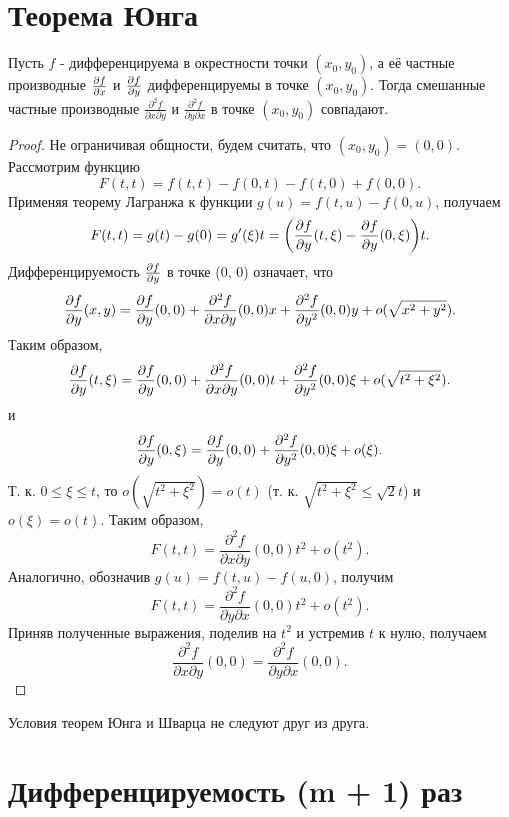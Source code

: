     \section{Теорема Юнга}
    
    \begin{theorem}[Юнг]
    	Пусть $f$ - дифференцируема в окрестности точки $(x_0, y_0)$, а её частные производные $\pdv{f}{x}$ и $\pdv{f}{y}$ дифференцируемы в точке $(x_0, y_0)$. Тогда смешанные частные производные $\frac{\partial^2 f}{\partial x \partial y}$ и $\frac{\partial^2 f}{\partial y \partial x}$ в точке $(x_0, y_0)$ совпадают.
    \end{theorem}
    
    \begin{proof}
    	Не ограничивая общности, будем считать, что $(x_0, y_0) = (0, 0)$. Рассмотрим функцию
    	\[ F(t, t) = f(t, t) - f(0, t) - f(t, 0) + f(0, 0). \]
    	Применяя теорему Лагранжа к функции $g(u) = f(t, u) - f(0, u)$, получаем
    	\[ F(t, t) = g(t) - g(0) = g'(\xi)t = \bigg(\frac{\partial f}{\partial y}(t, \xi) - \frac{\partial f}{\partial y}(0, \xi)\bigg)t. \]
    	Дифференцируемость $\frac{\partial f}{\partial y}$ в точке (0, 0) означает, что
    	\[ \frac{\partial f}{\partial y}(x, y) = \frac{\partial f}{\partial y}(0, 0) + \frac{\partial^2 f}{\partial x \partial y}(0, 0)x + \frac{\partial^2 f}{\partial y^2}(0, 0)y + o(\sqrt{x^2 + y^2}). \]
    	Таким образом,
    	\[ \frac{\partial f}{\partial y}(t, \xi) = \frac{\partial f}{\partial y}(0, 0) + \frac{\partial^2 f}{\partial x \partial y}(0, 0)t + \frac{\partial^2 f}{\partial y^2}(0, 0)\xi + o(\sqrt{t^2 + \xi^2}). \]
    	и
    	\[ \frac{\partial f}{\partial y}(0, \xi) = \frac{\partial f}{\partial y}(0, 0) + \frac{\partial^2 f}{\partial y^2}(0, 0)\xi + o(\xi). \]
    	Т. к. $0 \leqslant \xi \leqslant t$, то $o(\sqrt{t^2 + \xi^2}) = o(t)$ (т. к. $\sqrt{t^2 + \xi^2} \leqslant \sqrt{2}t$) и $o(\xi) = o(t)$. Таким образом,
    	\[ F(t, t) = \frac{\partial^2 f}{\partial x \partial y}(0, 0)t^2 + o(t^2). \]
    	Аналогично, обозначив $g(u) = f(t, u) - f(u, 0)$, получим
    	\[ F(t, t) = \frac{\partial^2 f}{\partial y \partial x}(0, 0)t^2 + o(t^2). \]
    	Приняв полученные выражения, поделив на $t^2$ и устремив $t$ к нулю, получаем
    	\[ \frac{\partial^2 f}{\partial x \partial y}(0, 0) = \frac{\partial^2 f}{\partial y \partial x}(0, 0). \]
    \end{proof}
    
    \begin{mention}
    	Условия теорем Юнга и Шварца не следуют друг из друга.
    \end{mention}
    
    \section{Дифференцируемость (m + 1) раз}
    

